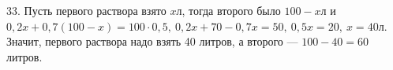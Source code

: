 33. Пусть первого раствора взято $x$л, тогда второго было $100-x$л и $0,2x+0,7(100-x)=100\cdot0,5,\
0,2x+70-0,7x=50,\ 0,5x=20,\ x=40$л. Значит, первого раствора надо взять 40 литров, а второго --- $100-40=60$ литров.\\
